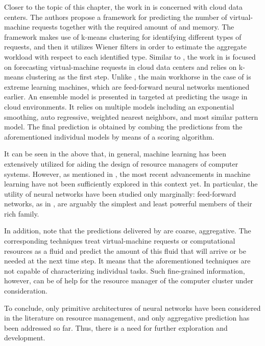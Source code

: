 Closer to the topic of this chapter, the work in \cite{dabbagh2015} is concerned
with cloud data centers. The authors propose a framework for predicting the
number of virtual-machine requests together with the required amount of 
and memory. The framework makes use of k-means clustering \cite{hastie2013} for
identifying different types of requests, and then it utilizes Wiener filters in
order to estimate the aggregate workload with respect to each identified type.
Similar to \cite{dabbagh2015}, the work in \cite{ismaeel2015} is focused on
forecasting virtual-machine requests in cloud data centers and relies on k-means
clustering as the first step. Unlike \cite{dabbagh2015}, the main workhorse in
the case of \cite{ismaeel2015} is extreme learning machines, which are
feed-forward neural networks mentioned earlier. An ensemble model
\cite{hastie2013} is presented in \cite{cao2014} targeted at predicting the
 usage in cloud environments. It relies on multiple models including an
exponential smoothing, auto regressive, weighted nearest neighbors, and most
similar pattern model. The final prediction is obtained by combing the
predictions from the aforementioned individual models by means of a scoring
algorithm.

It can be seen in the above that, in general, machine learning has been
extensively utilized for aiding the design of resource managers of computer
systems. However, as mentioned in , the most recent
advancements in machine learning have not been sufficiently explored in this
context yet. In particular, the utility of neural networks have been studied
only marginally: feed-forward networks, as in \cite{kumar2010, ismaeel2015}, are
arguably the simplest and least powerful members of their rich family.

In addition, note that the predictions delivered by \cite{dabbagh2015,
ismaeel2015, cao2014} are coarse, aggregative. The corresponding techniques
treat virtual-machine requests or computational resources as a fluid and predict
the amount of this fluid that will arrive or be needed at the next time step. It
means that the aforementioned techniques are not capable of characterizing
individual tasks. Such fine-grained information, however, can be of help for the
resource manager of the computer cluster under consideration.

To conclude, only primitive architectures of neural networks have been
considered in the literature on resource management, and only aggregative
prediction has been addressed so far. Thus, there is a need for further
exploration and development.

